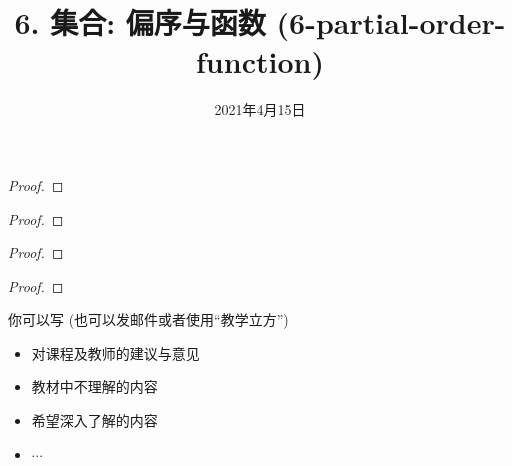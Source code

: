 \documentclass[a4paper, justified]{tufte-handout}
\title{6. 集合: 偏序与函数 (6-partial-order-function)}
\date{2021年4月15日}
\begin{document}
\maketitle
\noplagiarism %
\begin{abstract}
\end{abstract}
\beginrequired

\begin{problem}
\end{problem}

\begin{proof}
\end{proof}

\begin{problem}
\end{problem}

\begin{proof}
\end{proof}

\begin{problem}
\end{problem}

\begin{proof}
\end{proof}

\begin{problem}
\end{problem}

\begin{proof}
\end{proof}

\begin{problem}
\end{problem}

\begin{solution}
\end{solution}

\begincorrection

\beginfb

你可以写 (也可以发邮件或者使用``教学立方'')
\begin{itemize}
  \item 对课程及教师的建议与意见
  \item 教材中不理解的内容
  \item 希望深入了解的内容
  \item $\cdots$
\end{itemize}
\end{document}
